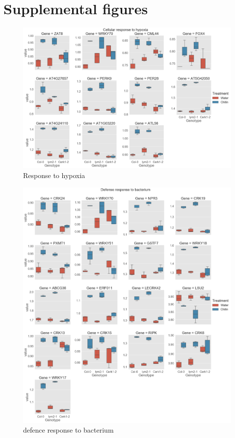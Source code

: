 \documentclass[../main.tex]{subfiles}
\begin{document}
\appendix

\chapter{Supplemental figures}
\label{cha:supplfig}

\begin{figure}[ht]
  \centering
  \includegraphics[width=\textwidth, height=\textheight, keepaspectratio]{figures/cellular response to hypoxia.png}
  \caption{\label{fig:resphypoxia} Response to hypoxia}
\end{figure}




\begin{figure}[ht]
  \centering
  \includegraphics[width=\textwidth,height=\textheight, keepaspectratio]{figures/defense response to bacterium.png}
  \caption{\label{fig:defbacterium} defence response to bacterium}
\end{figure}
\end{document}
